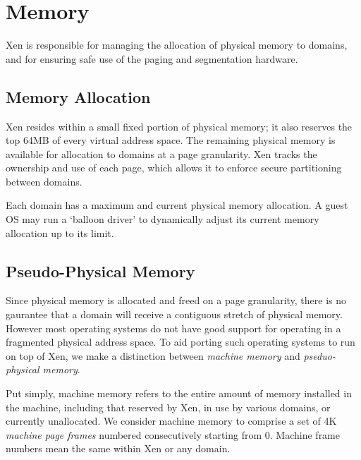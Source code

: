 \documentclass[11pt,twoside,final,openright]{xenstyle}
\begin{document}
\chapter{Memory}
\label{c:memory} 

Xen is responsible for managing the allocation of physical memory to
domains, and for ensuring safe use of the paging and segmentation
hardware.


\section{Memory Allocation}


Xen resides within a small fixed portion of physical memory; it also
reserves the top 64MB of every virtual address space. The remaining
physical memory is available for allocation to domains at a page
granularity.  Xen tracks the ownership and use of each page, which
allows it to enforce secure partitioning between domains.

Each domain has a maximum and current physical memory allocation. 
A guest OS may run a `balloon driver' to dynamically adjust its 
current memory allocation up to its limit. 



\section{Pseudo-Physical Memory}

Since physical memory is allocated and freed on a page granularity,
there is no gaurantee that a domain will receive a contiguous stretch
of physical memory. However most operating systems do not have good
support for operating in a fragmented physical address space. To aid
porting such operating systems to run on top of Xen, we make a
distinction between \emph{machine memory} and \emph{pseduo-physical
memory}.

Put simply, machine memory refers to the entire amount of memory
installed in the machine, including that reserved by Xen, in use by
various domains, or currently unallocated. We consider machine memory
to comprise a set of 4K \emph{machine page frames} numbered
consecutively starting from 0. Machine frame numbers mean the same
within Xen or any domain.
\end{document}

